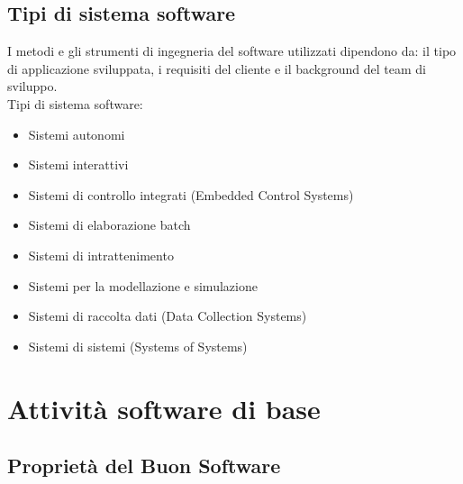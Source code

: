 \documentclass{article}
\begin{document}
	\subsection{Tipi di sistema software}
	I metodi e gli strumenti di ingegneria del software utilizzati dipendono da: il tipo di
	applicazione sviluppata, i requisiti del cliente e il background del team di sviluppo.\\
	Tipi di sistema software:
	\begin{itemize}
		\item Sistemi autonomi
		\item Sistemi interattivi
		\item Sistemi di controllo integrati (Embedded Control Systems)
		\item Sistemi di elaborazione batch
		\item Sistemi di intrattenimento
		\item Sistemi per la modellazione e simulazione
		\item Sistemi di raccolta dati (Data Collection Systems)
		\item Sistemi di sistemi (Systems of Systems)
	\end{itemize}
	
	\section{Attività software di base}
	\subsection{Proprietà del Buon Software}
\end{document}

